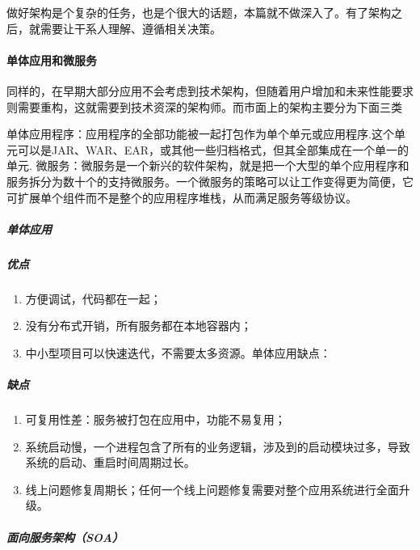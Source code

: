 \documentclass[letterpaper,10pt,english]{sphinxmanual}
\begin{document}
做好架构是个复杂的任务，也是个很大的话题，本篇就不做深入了。有了架构之后，就需要让干系人理解、遵循相关决策。


\paragraph{单体应用和微服务}
\label{\detokenize{chapter_idea/understand_tech:id15}}
同样的，在早期大部分应用不会考虑到技术架构，但随着用户增加和未来性能要求则需要重构，这就需要到技术资深的架构师。而市面上的架构主要分为下面三类

单体应用程序：应用程序的全部功能被一起打包作为单个单元或应用程序.这个单元可以是JAR、WAR、EAR，或其他一些归档格式，但其全部集成在一个单一的单元.
微服务：微服务是一个新兴的软件架构，就是把一个大型的单个应用程序和服务拆分为数十个的支持微服务。一个微服务的策略可以让工作变得更为简便，它可扩展单个组件而不是整个的应用程序堆栈，从而满足服务等级协议。


\subparagraph{单体应用}
\label{\detokenize{chapter_idea/understand_tech:id16}}

\subparagraph{优点}
\label{\detokenize{chapter_idea/understand_tech:id17}}\begin{enumerate}
%
\item {} 
方便调试，代码都在一起；

\item {} 
没有分布式开销，所有服务都在本地容器内；

\item {} 
中小型项目可以快速迭代，不需要太多资源。单体应用缺点：

\end{enumerate}


\subparagraph{缺点}
\label{\detokenize{chapter_idea/understand_tech:id18}}\begin{enumerate}
%
\item {} 
可复用性差：服务被打包在应用中，功能不易复用；

\item {} 
系统启动慢，一个进程包含了所有的业务逻辑，涉及到的启动模块过多，导致系统的启动、重启时间周期过长。

\item {} 
线上问题修复周期长；任何一个线上问题修复需要对整个应用系统进行全面升级。

\end{enumerate}


\subparagraph{面向服务架构（SOA）}
\label{\detokenize{chapter_idea/understand_tech:soa}}\label{\detokenize{chapter_idea/understand_tech:id20}}\label{\detokenize{chapter_idea/understand_tech:id19}}
\end{document}
